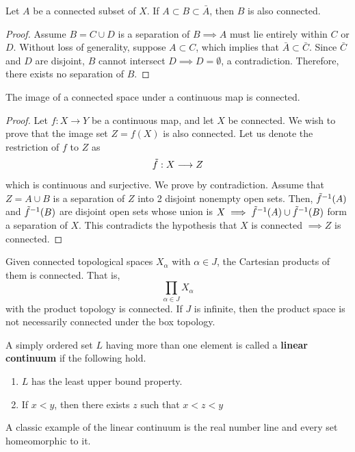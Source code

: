 \documentclass{article}
\begin{document}
    \begin{theorem}
    Let $A$ be a connected subset of $X$. If $A \subset B \subset \bar{A}$, then $B$ is also connected. 
    \end{theorem}
    \begin{proof}
    Assume $B = C \cup D$ is a separation of $B \implies A$ must lie entirely within $C$ or $D$. Without loss of generality, suppose $A \subset C$, which implies that $\bar{A} \subset \bar{C}$. Since $\bar{C}$ and $D$ are disjoint, $B$ cannot intersect $D \implies D = \emptyset$, a contradiction. Therefore, there exists no separation of $B$. 
    \end{proof}

    \begin{theorem}
    The image of a connected space under a continuous map is connected. 
    \end{theorem}
    \begin{proof}
    Let $f: X \longrightarrow Y$ be a continuous map, and let $X$ be connected. We wish to prove that the image set $Z = f(X)$ is also connected. Let us denote the restriction of $f$ to $Z$ as
    \[\Tilde{f}: X \longrightarrow Z\]
    which is continuous and surjective. We prove by contradiction. Assume that $Z = A \cup B$ is a separation of $Z$ into 2 disjoint nonempty open sets. Then, $\Tilde{f}^{-1} (A)$ and $\Tilde{f}^{-1}(B)$ are disjoint open sets whose union is $X \implies \Tilde{f}^{-1} (A) \cup \Tilde{f}^{-1}(B)$ form a separation of $X$. This contradicts the hypothesis that $X$ is connected $\implies Z$ is connected.  
    \end{proof}

    \begin{theorem}
    Given connected topological spaces $X_\alpha$ with $\alpha \in J$, the Cartesian products of them is connected. That is, 
    \[\prod_{\alpha \in J} X_\alpha\]
    with the product topology is connected. If $J$ is infinite, then the product space is not necessarily connected under the box topology. 
    \end{theorem}

    \begin{definition}
    A simply ordered set $L$ having more than one element is called a \textbf{linear continuum} if the following hold. 
    \begin{enumerate}
        \item $L$ has the least upper bound property. 
        \item If $x <y$, then there exists $z$ such that $x<z<y$
    \end{enumerate}
    A classic example of the linear continuum is the real number line and every set homeomorphic to it. 
    \end{definition}
\end{document}
